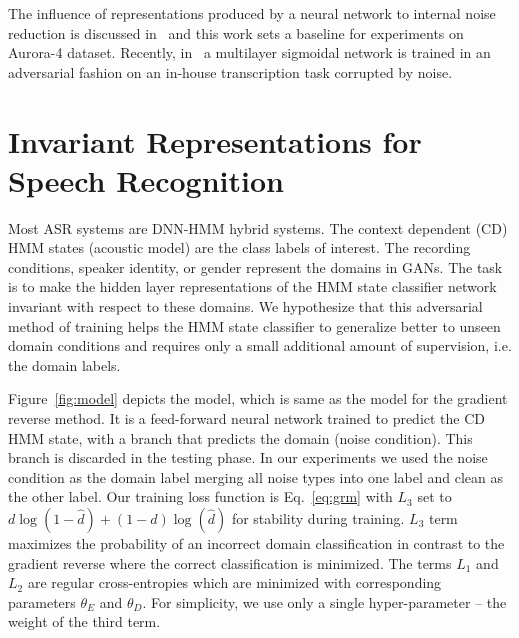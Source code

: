 \documentclass{article}
\begin{document}

The influence of representations produced by a neural network to internal noise reduction is discussed in~\cite{yu2013feature} and this work sets a baseline for experiments on  Aurora-4 dataset. Recently, in~\cite{yusuke2016adversarial} a multilayer sigmoidal network is trained in an adversarial fashion on an in-house transcription task corrupted by noise.
\section{Invariant Representations for Speech Recognition}
\label{sec:invariant-speech}

Most ASR systems are DNN-HMM hybrid systems. The context dependent (CD) HMM states (acoustic model) are the class labels of interest. The
recording conditions, speaker identity, or gender represent the domains in GANs. The task is to make the hidden layer representations of the HMM state classifier network 
invariant with respect to these domains. We hypothesize that this adversarial method of
training helps the HMM state classifier to generalize better to unseen domain conditions and requires only a  
small additional amount of supervision, i.e. the domain labels.  

Figure~\ref{fig:model} depicts the model, which is same as the model for the gradient reverse method. It is a feed-forward neural network trained to predict the CD HMM state, with a branch that predicts the domain (noise condition). This branch is discarded in the testing phase. In our experiments we
used the noise condition as the domain label merging all noise types into one label
and clean as the other label. Our training loss function is Eq.~\ref{eq:grm} with 
$L_3$ set to $d\log(1 - \hat{d}) + (1-d)\log(\hat{d})$ for stability during training. 
$L_3$ term maximizes the probability
of an incorrect domain classification in contrast to the gradient reverse where the 
correct classification is minimized.
The terms $L_1$ and $L_2$ are 
regular cross-entropies which are minimized with corresponding parameters $\theta_E$ and $\theta_D$.
For simplicity, we use only a single hyper-parameter -- the weight of the third term.
 
\end{document}
